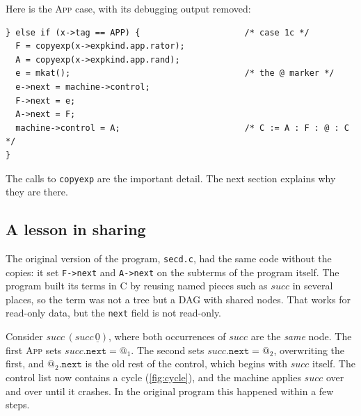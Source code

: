 \documentclass[11pt,a4paper]{article}
\makeatletter
\newcommand{\ap}{\mathtt{@}}
\newcommand{\rul}[1]{\textsc{#1}}
\theoremstyle{definition}
\theoremstyle{plain}
\makeatother
\begin{document}
Here is the \rul{App} case, with its debugging output removed:
\begin{lstlisting}
} else if (x->tag == APP) {                     /* case 1c */
  F = copyexp(x->expkind.app.rator);
  A = copyexp(x->expkind.app.rand);
  e = mkat();                                   /* the @ marker */
  e->next = machine->control;
  F->next = e;
  A->next = F;
  machine->control = A;                         /* C := A : F : @ : C */
}
\end{lstlisting}
The calls to \texttt{copyexp} are the important detail. The next section
explains why they are there.

\subsection{A lesson in sharing}\label{sec:sharing}

The original version of the program, \texttt{secd.c}, had the same code without
the copies: it set \texttt{F->next} and \texttt{A->next} on the subterms of the
program itself. The program built its terms in C by reusing named pieces such as
$\mathit{succ}$ in several places, so the term was not a tree but a DAG with
shared nodes. That works for read-only data, but the \texttt{next} field is not
read-only.

Consider $\mathit{succ}\,(\mathit{succ}\,\underline{0})$, where both occurrences
of $\mathit{succ}$ are the \emph{same} node. The first \rul{App} sets
$\mathit{succ}.\texttt{next} = \ap_1$. The second sets
$\mathit{succ}.\texttt{next} = \ap_2$, overwriting the first, and
$\ap_2.\texttt{next}$ is the old rest of the control, which begins with
$\mathit{succ}$ itself. The control list now contains a cycle
(\cref{fig:cycle}), and the machine applies $\mathit{succ}$ over and over
until it crashes. In the original program this happened within a few steps.
\end{document}

